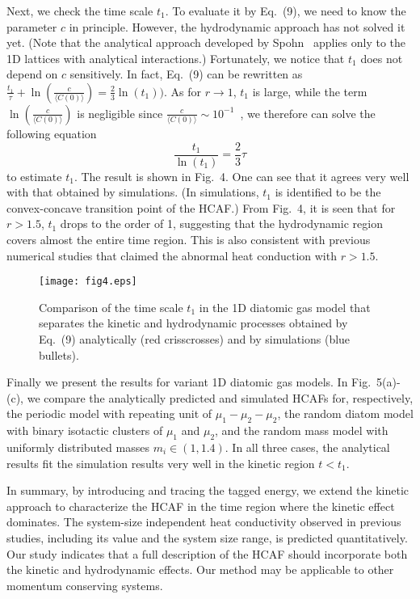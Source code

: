 \documentclass[twocolumn,secnumarabic,amssymb, nobibnotes, aps, pre,superscriptaddress]{revtex4}
\begin{document}
Next, we check the time scale $t_1$. To evaluate it by Eq.~(9), we need to know the parameter $c$ in principle. However, the hydrodynamic approach has not solved it yet. (Note that the analytical approach developed by Spohn~\cite{spohn} applies only to the 1D lattices with analytical interactions.) Fortunately, we notice that $t_1$ does not depend on $c$ sensitively. In fact, Eq.~(9) can be rewritten as $\frac{t_1}{\tau}+\ln (\frac{c}{\langle C(0)\rangle})=\frac{2}{3}\ln(t_1))$. As for $r\to1$, $t_1$ is large, while the term $\ln(\frac{c}{\langle C(0)\rangle})$ is negligible since $\frac{c}{\langle C(0)\rangle }\sim10^{-1}$~\cite{spohn2},  we therefore can solve the following equation
\begin{equation}
\frac{t_1}{\ln(t_1)}=\frac{2}{3}\tau
\end{equation}
to estimate $t_1$. The result is shown in Fig.~4. One can see that it agrees very well with that obtained by simulations. (In simulations, $t_1$ is identified to be the convex-concave transition point of the HCAF.) From Fig.~4, it is seen that for $r>1.5$, $t_1$ drops to the order of 1, suggesting that the hydrodynamic region covers almost the entire time region. This is also consistent with previous numerical studies that claimed the abnormal heat conduction with $r>1.5$.


    \begin{figure}[!t]
    \centering
    \texttt{[image: fig4.eps]}
    \caption{Comparison of the time scale $t_1$ in the 1D diatomic gas model that separates the kinetic and hydrodynamic processes obtained by Eq.~(9) analytically (red crisscrosses) and by simulations (blue bullets). }
    \end{figure}


Finally we present the results for variant 1D diatomic gas models. In Fig.~5(a)-(c), we compare the analytically predicted and simulated HCAFs for, respectively, the periodic model with repeating unit of $\mu_1-\mu_2-\mu_2$, the random diatom model with binary isotactic clusters of $\mu_1$ and $\mu_2$, and the random mass model with uniformly distributed masses $m_i\in (1,1.4)$. In all three cases, the analytical results fit the simulation results very well in the kinetic region $t<t_1$.
 
In summary, by introducing and tracing the tagged energy, we extend the kinetic approach to characterize the HCAF in the time region where the kinetic effect dominates. The system-size independent heat conductivity observed in previous studies, including its value and the system size range, is predicted quantitatively. Our study indicates that a full description of the HCAF should incorporate both the kinetic and hydrodynamic effects. Our method may be  applicable to other momentum conserving systems.
\end{document}
